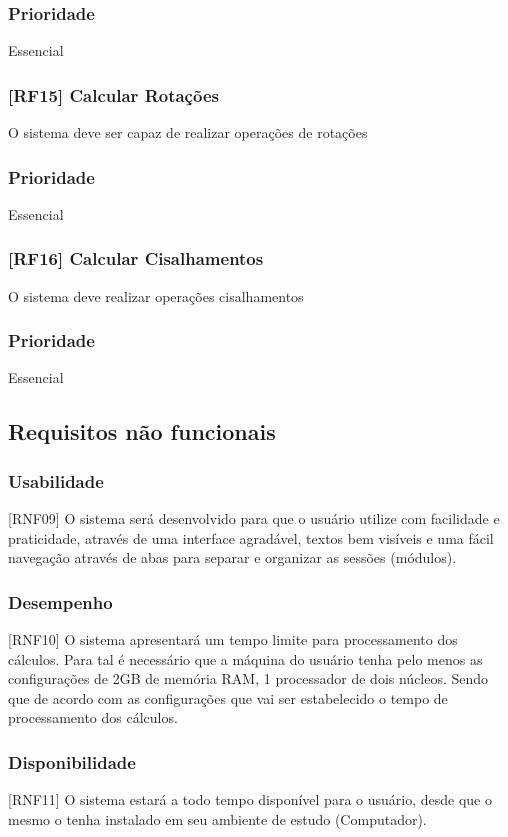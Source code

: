 \documentclass{scrreprt}
\begin{document}
\subsubsection{Prioridade}
Essencial

\subsubsection{[RF15] Calcular Rotações }
O sistema deve ser capaz de realizar operações de rotações
\subsubsection{Prioridade}
Essencial

\subsubsection{[RF16] Calcular Cisalhamentos }
O sistema deve realizar operações cisalhamentos
\subsubsection{Prioridade}
Essencial


\subsection{Requisitos não funcionais}

\subsubsection{Usabilidade}
[RNF09] O sistema será desenvolvido para que o usuário utilize com facilidade e praticidade, através de uma interface agradável, textos bem visíveis e uma fácil navegação através de abas para separar e organizar as sessões (módulos). 

\subsubsection{Desempenho}
[RNF10] O sistema apresentará um tempo limite para processamento dos cálculos. Para tal é necessário que a máquina do usuário tenha pelo menos as configurações de 2GB de memória RAM, 1 processador de dois núcleos. Sendo que de acordo com as configurações que vai ser estabelecido o tempo de processamento dos cálculos.

\subsubsection{Disponibilidade}
[RNF11] O sistema estará a todo tempo disponível para o usuário, desde que o mesmo o tenha instalado em seu ambiente de estudo (Computador).
\end{document}
